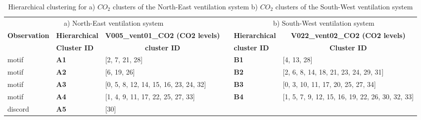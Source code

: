 \begin{table}[htbp]
  \centering
  \scriptsize
  \caption{Hierarchical clustering for a) $CO_2$ clusters of the North-East ventilation system b) $CO_2$ clusters of the South-West ventilation system}
       \begin{tabular}{|l|l|l|rrr}
    \multicolumn{3}{c}{a) North-East ventilation system} &      & \multicolumn{2}{c}{b) South-West ventilation system} \bigstrut[b]\\
\cline{1-3}\cline{5-6}    \rowcolor[rgb]{ .851,  .851,  .851} \textbf{Observation} & \textbf{Hierarchical} & \multicolumn{1}{c|}{\textbf{V005\_vent01\_CO2 (CO2 levels)}} & \multicolumn{1}{r|}{\cellcolor[rgb]{ 1,  1,  1} } & \multicolumn{1}{l|}{\textbf{Hierarchical}} & \multicolumn{1}{c|}{\textbf{V022\_vent02\_CO2 (CO2 levels)}} \bigstrut[t]\\
    \rowcolor[rgb]{ .851,  .851,  .851}      & \textbf{Cluster ID} & \multicolumn{1}{c|}{\textbf{cluster ID}} & \multicolumn{1}{r|}{\cellcolor[rgb]{ 1,  1,  1} } & \multicolumn{1}{l|}{\textbf{cluster ID}} & \multicolumn{1}{c|}{\textbf{Cluster ID}} \bigstrut[b]\\
\cline{1-3}\cline{5-6}    motif & \cellcolor[rgb]{ .949,  .949,  .949} \textbf{A1 } & [2, 7, 21, 28]  & \multicolumn{1}{r|}{} & \multicolumn{1}{l|}{\cellcolor[rgb]{ .949,  .949,  .949} \textbf{B1}} & \multicolumn{1}{l|}{[4, 13, 28]} \bigstrut\\
\cline{1-3}\cline{5-6}    motif & \cellcolor[rgb]{ .949,  .949,  .949} \textbf{A2} & [6, 19, 26]  & \multicolumn{1}{r|}{} & \multicolumn{1}{l|}{\cellcolor[rgb]{ .949,  .949,  .949} \textbf{B2}} & \multicolumn{1}{l|}{[2, 6, 8, 14, 18, 21, 23, 24, 29, 31]} \bigstrut\\
\cline{1-3}\cline{5-6}    motif & \cellcolor[rgb]{ .949,  .949,  .949} \textbf{A3} & [0, 5, 8, 12, 14, 15, 16, 23, 24, 32]  & \multicolumn{1}{r|}{} & \multicolumn{1}{l|}{\cellcolor[rgb]{ .949,  .949,  .949} \textbf{B3}} & \multicolumn{1}{l|}{[0, 3, 10, 11, 17, 20, 25, 27, 34]} \bigstrut\\
\cline{1-3}\cline{5-6}    motif & \cellcolor[rgb]{ .949,  .949,  .949} \textbf{A4} & [1, 4, 9, 11, 17, 22, 25, 27, 33]  & \multicolumn{1}{r|}{} & \multicolumn{1}{l|}{\cellcolor[rgb]{ .949,  .949,  .949} \textbf{B4}} & \multicolumn{1}{l|}{[1, 5, 7, 9, 12, 15, 16, 19, 22, 26, 30, 32, 33]} \bigstrut\\
\cline{1-3}\cline{5-6}    discord & \cellcolor[rgb]{ .949,  .949,  .949} \textbf{A5} & [30]  &      &      &  \bigstrut\\

\end{tabular}
\end{table}
